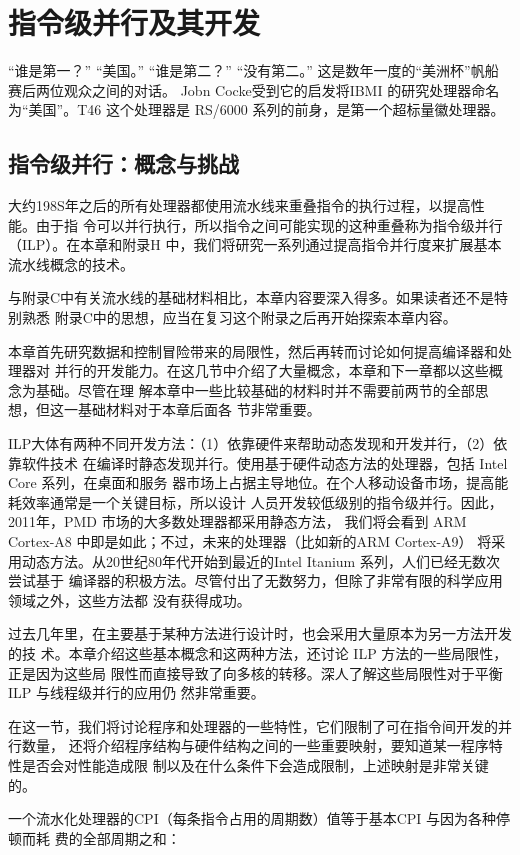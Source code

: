 \chapter{指令级并行及其开发}
“谁是第一？”
“美国。”
“谁是第二？”
“没有第二。”
这是数年一度的“美洲杯”帆船赛后两位观众之间的对话。
Jobn Cocke受到它的启发将IBMI 的研究处理器命名为“美国”。T46
这个处理器是 RS/6000 系列的前身，是第一个超标量徽处理器。

\section{指令级并行：概念与挑战}
大约198S年之后的所有处理器都使用流水线来重叠指令的执行过程，以提高性能。由于指
令可以并行执行，所以指令之间可能实现的这种重叠称为指令级并行（ILP）。在本章和附录H
中，我们将研究一系列通过提高指令并行度来扩展基本流水线概念的技术。

与附录C中有关流水线的基础材料相比，本章内容要深入得多。如果读者还不是特别熟悉
附录C中的思想，应当在复习这个附录之后再开始探索本章内容。

本章首先研究数据和控制冒险带来的局限性，然后再转而讨论如何提高编译器和处理器对
并行的开发能力。在这几节中介绍了大量概念，本章和下一章都以这些概念为基础。尽管在理
解本章中一些比较基础的材料时并不需要前两节的全部思想，但这一基础材料对于本章后面各
节非常重要。

ILP大体有两种不同开发方法：（1）依靠硬件来帮助动态发现和开发并行，（2）依靠软件技术
在编译时静态发现并行。使用基于硬件动态方法的处理器，包括 Intel Core 系列，在桌面和服务
器市场上占据主导地位。在个人移动设备市场，提高能耗效率通常是一个关键目标，所以设计
人员开发较低级别的指令级并行。因此，2011年，PMD 市场的大多数处理器都采用静态方法，
我们将会看到 ARM Cortex-A8 中即是如此；不过，未来的处理器（比如新的ARM Cortex-A9）
将采用动态方法。从20世纪80年代开始到最近的Intel Itanium 系列，人们已经无数次尝试基于
编译器的积极方法。尽管付出了无数努力，但除了非常有限的科学应用领域之外，这些方法都
没有获得成功。

过去几年里，在主要基于某种方法进行设计时，也会采用大量原本为另一方法开发的技
术。本章介绍这些基本概念和这两种方法，还讨论 ILP 方法的一些局限性，正是因为这些局
限性而直接导致了向多核的转移。深人了解这些局限性对于平衡ILP 与线程级并行的应用仍
然非常重要。

在这一节，我们将讨论程序和处理器的一些特性，它们限制了可在指令间开发的并行数量，
还将介绍程序结构与硬件结构之间的一些重要映射，要知道某一程序特性是否会对性能造成限
制以及在什么条件下会造成限制，上述映射是非常关键的。

一个流水化处理器的CPI（每条指令占用的周期数）值等于基本CPI 与因为各种停顿而耗
费的全部周期之和：

